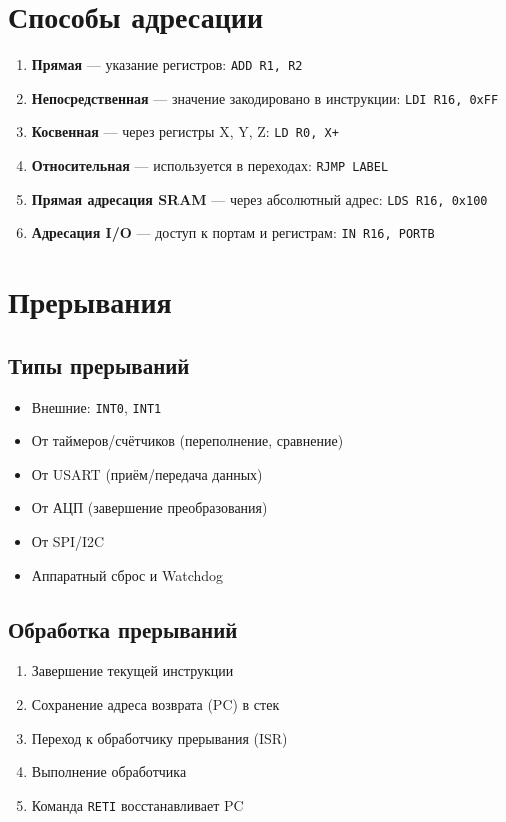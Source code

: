 \documentclass[a4paper,12pt]{article}
\begin{document}
\section{Способы адресации}
\begin{enumerate}
    \item \textbf{Прямая} — указание регистров: \texttt{ADD R1, R2}
    \item \textbf{Непосредственная} — значение закодировано в инструкции: \texttt{LDI R16, 0xFF}
    \item \textbf{Косвенная} — через регистры X, Y, Z: \texttt{LD R0, X+}
    \item \textbf{Относительная} — используется в переходах: \texttt{RJMP LABEL}
    \item \textbf{Прямая адресация SRAM} — через абсолютный адрес: \texttt{LDS R16, 0x100}
    \item \textbf{Адресация I/O} — доступ к портам и регистрам: \texttt{IN R16, PORTB}
\end{enumerate}

\section{Прерывания}
\subsection{Типы прерываний}
\begin{itemize}
    \item Внешние: \texttt{INT0}, \texttt{INT1}
    \item От таймеров/счётчиков (переполнение, сравнение)
    \item От USART (приём/передача данных)
    \item От АЦП (завершение преобразования)
    \item От SPI/I2C
    \item Аппаратный сброс и Watchdog
\end{itemize}

\subsection{Обработка прерываний}
\begin{enumerate}
    \item Завершение текущей инструкции
    \item Сохранение адреса возврата (PC) в стек
    \item Переход к обработчику прерывания (ISR)
    \item Выполнение обработчика
    \item Команда \texttt{RETI} восстанавливает PC
\end{enumerate}
\end{document}
